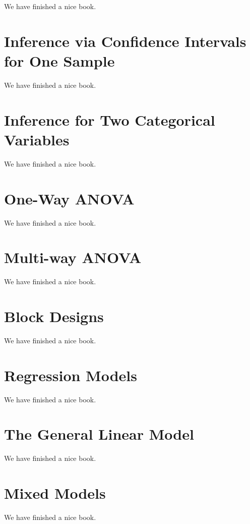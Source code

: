 \documentclass[]{book}
\begin{document}
We have finished a nice book.

\chapter{Inference via Confidence Intervals for One Sample}\label{CI}

We have finished a nice book.

\chapter{Inference for Two Categorical Variables}\label{twocategorical}

We have finished a nice book.

\chapter{One-Way ANOVA}\label{anova}

We have finished a nice book.

\chapter{Multi-way ANOVA}\label{multiway}

We have finished a nice book.

\chapter{Block Designs}\label{block}

We have finished a nice book.

\chapter{Regression Models}\label{regression}

We have finished a nice book.

\chapter{The General Linear Model}\label{glm}

We have finished a nice book.

\chapter{Mixed Models}\label{mixedmodels}

We have finished a nice book.
\end{document}
